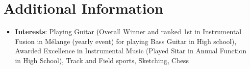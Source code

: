 \documentclass[a4paper,20pt]{article}
\newcommand{\resumeItem}[2]{
  \item\small{
    \textbf{#1}{: #2 \vspace{-2pt}}
  }
}
\newcommand{\resumeSubItem}[2]{\resumeItem{#1}{#2}\vspace{-3pt}}
\newcommand{\resumeSubHeadingListStart}{\begin{itemize}[leftmargin=*]}
\newcommand{\resumeSubHeadingListEnd}{\end{itemize}}
\begin{document}
\section{Additional Information}
	\resumeSubHeadingListStart
    \resumeSubItem{Interests} {Playing Guitar (Overall Winner and ranked 1st in Instrumental Fusion in Mélange (yearly event) for playing Bass Guitar in High school), Awarded Excellence in Instrumental Music (Played Sitar in Annual Function in High School), Track and Field sports, Sketching, Chess}
    \resumeSubHeadingListEnd
\end{document}
